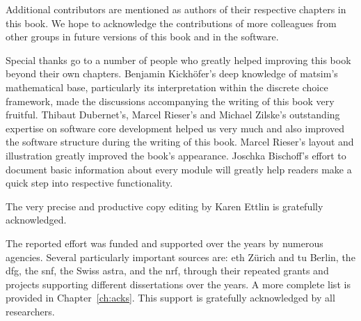 % 
Additional contributors are mentioned as authors of their respective chapters in this book.  We hope to acknowledge the contributions of more colleagues from other groups in future versions of this book and in the software.   



Special thanks go to a number of people who greatly helped improving this book beyond their own chapters.
Benjamin Kickhöfer's deep knowledge of \gls{matsim}'s mathematical base, particularly its interpretation within the discrete choice framework, made the discussions accompanying the writing of this book very fruitful. 
Thibaut Dubernet's, Marcel Rieser's and Michael Zilske's outstanding expertise on software core development helped us very much and also improved the software structure during the writing of this book.
Marcel Rieser's layout and illustration greatly improved the book's appearance.
Joschka Bischoff's effort to document basic information about every module will greatly help readers make a quick step into respective functionality.

The very precise and productive copy editing by Karen Ettlin is gratefully acknowledged. %

The reported effort was funded and supported over the years by numerous agencies. Several particularly important sources are: \gls{eth} Zürich and \gls{tu} Berlin,
the \gls{dfg}, the \gls{snf}, the Swiss \gls{astra}, 
and the \gls{nrf}, through their repeated grants and projects supporting different dissertations over the years.  A more complete list is provided in Chapter~\ref{ch:acks}.  This support is gratefully acknowledged by all researchers. 

